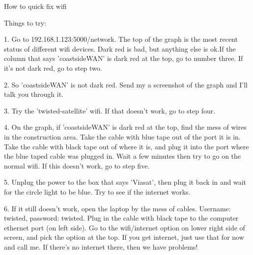 \documentclass[letterpaper,11pt]{article}
\begin{document}
\begin{center}
  {\Huge How to quick fix wifi} 
\end{center}

Things to try:

1. Go to 192.168.1.123:5000/network. The top of the graph is the most recent status of different wifi devices. Dark red is bad, but anything else is ok.If the column that says 'coastsideWAN' is dark red at the top, go to number three. If it's not dark red, go to step two. \par

2. So 'coastsideWAN' is not dark red. Send my a screenshot of the graph and I'll talk you through it. \par

3. Try the 'twisted-satellite' wifi. If that doesn't work, go to step four.

4. On the graph, if 'coastsideWAN' is dark red at the top, find the mess of wires in the construction area. Take the cable with blue tape out of the port it is in. Take the cable with black tape out of where it is, and plug it into the port where the blue taped cable was plugged in. Wait a few minutes then try to go on the normal wifi. If this doesn't work, go to step five.

5. Unplug the power to the box that says 'Viasat', then plug it back in and wait for the circle light to be blue. Try to see if the internet works.

6. If it still doesn't work, open the laptop by the mess of cables. Username: twisted, password: twisted. Plug in the cable with black tape to the computer ethernet port (on left side). Go to the wifi/internet option on lower right side of screen, and pick the option at the top. If you get internet, just use that for now and call me. If there's no internet there, then we have problems!
\end{document}
